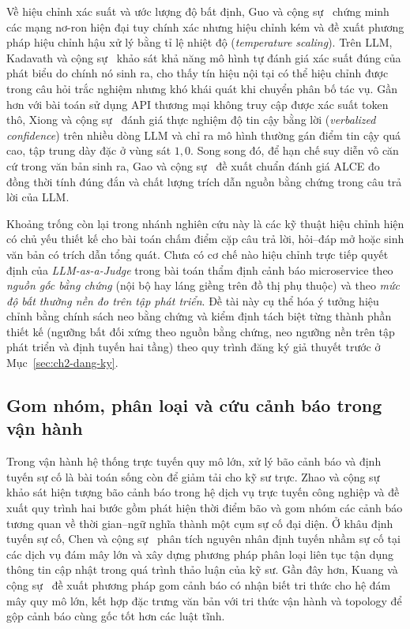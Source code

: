 Về hiệu chỉnh xác suất và ước lượng độ bất định, Guo và cộng sự~\cite{guo2017calibration} chứng minh các mạng nơ-ron hiện đại tuy chính xác nhưng hiệu chỉnh kém và đề xuất phương pháp hiệu chỉnh hậu xử lý bằng tỉ lệ nhiệt độ (\emph{temperature scaling}). Trên LLM, Kadavath và cộng sự~\cite{kadavath2022mostly} khảo sát khả năng mô hình tự đánh giá xác suất đúng của phát biểu do chính nó sinh ra, cho thấy tín hiệu nội tại có thể hiệu chỉnh được trong câu hỏi trắc nghiệm nhưng khó khái quát khi chuyển phân bố tác vụ. Gần hơn với bài toán sử dụng API thương mại không truy cập được xác suất token thô, Xiong và cộng sự~\cite{xiong2024uncertainty} đánh giá thực nghiệm độ tin cậy bằng lời (\emph{verbalized confidence}) trên nhiều dòng LLM và chỉ ra mô hình thường gán điểm tin cậy quá cao, tập trung dày đặc ở vùng sát $1{,}0$. Song song đó, để hạn chế suy diễn vô căn cứ trong văn bản sinh ra, Gao và cộng sự~\cite{gao2023alce} đề xuất chuẩn đánh giá ALCE đo đồng thời tính đúng đắn và chất lượng trích dẫn nguồn bằng chứng trong câu trả lời của LLM.

Khoảng trống còn lại trong nhánh nghiên cứu này là các kỹ thuật hiệu chỉnh hiện có chủ yếu thiết kế cho bài toán chấm điểm cặp câu trả lời, hỏi--đáp mở hoặc sinh văn bản có trích dẫn tổng quát. Chưa có cơ chế nào hiệu chỉnh trực tiếp quyết định của \emph{LLM-as-a-Judge} trong bài toán thẩm định cảnh báo microservice theo \emph{nguồn gốc bằng chứng} (nội bộ hay láng giềng trên đồ thị phụ thuộc) và theo \emph{mức độ bất thường nền đo trên tập phát triển}. Đề tài này cụ thể hóa ý tưởng hiệu chỉnh bằng chính sách neo bằng chứng và kiểm định tách biệt từng thành phần thiết kế (ngưỡng bất đối xứng theo nguồn bằng chứng, neo ngưỡng nền trên tập phát triển và định tuyến hai tầng) theo quy trình đăng ký giả thuyết trước ở Mục~\ref{sec:ch2-dang-ky}.

\subsection{Gom nhóm, phân loại và cứu cảnh báo trong vận hành}
\label{sec:ch3-alert-triage}

Trong vận hành hệ thống trực tuyến quy mô lớn, xử lý bão cảnh báo và định tuyến sự cố là bài toán sống còn để giảm tải cho kỹ sư trực. Zhao và cộng sự~\cite{zhao2020alertstorm} khảo sát hiện tượng bão cảnh báo trong hệ dịch vụ trực tuyến công nghiệp và đề xuất quy trình hai bước gồm phát hiện thời điểm bão và gom nhóm các cảnh báo tương quan về thời gian--ngữ nghĩa thành một cụm sự cố đại diện. Ở khâu định tuyến sự cố, Chen và cộng sự~\cite{chen2019empirical,chen2019continuous} phân tích nguyên nhân định tuyến nhầm sự cố tại các dịch vụ đám mây lớn và xây dựng phương pháp phân loại liên tục tận dụng thông tin cập nhật trong quá trình thảo luận của kỹ sư. Gần đây hơn, Kuang và cộng sự~\cite{kuang2024knowledge} đề xuất phương pháp gom cảnh báo có nhận biết tri thức cho hệ đám mây quy mô lớn, kết hợp đặc trưng văn bản với tri thức vận hành và topology để gộp cảnh báo cùng gốc tốt hơn các luật tĩnh.

